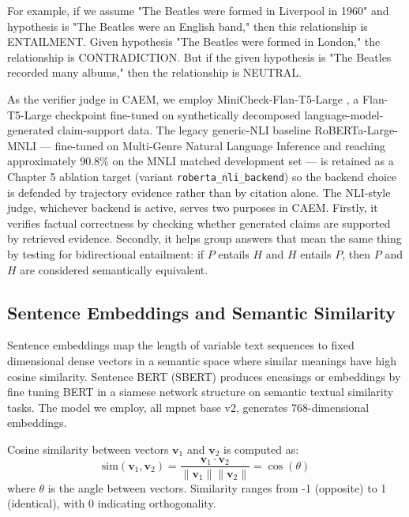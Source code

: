 For example, if we assume "The Beatles were formed in Liverpool in 1960" and hypothesis is "The Beatles were an English band," then this relationship is ENTAILMENT. Given hypothesis "The Beatles were formed in London," the relationship is CONTRADICTION. But if the given hypothesis is "The Beatles recorded many albums," then the relationship is NEUTRAL.

As the verifier judge in CAEM, we employ MiniCheck-Flan-T5-Large \citep{tang2024minicheck}, a Flan-T5-Large checkpoint fine-tuned on synthetically decomposed language-model-generated claim-support data. The legacy generic-NLI baseline RoBERTa-Large-MNLI \cite{liu2019roberta} --- fine-tuned on Multi-Genre Natural Language Inference and reaching approximately 90.8\% on the MNLI matched development set --- is retained as a Chapter 5 ablation target (variant \texttt{roberta\_nli\_backend}) so the backend choice is defended by trajectory evidence rather than by citation alone. The NLI-style judge, whichever backend is active, serves two purposes in CAEM. Firstly, it verifies factual correctness by checking whether generated claims are supported by retrieved evidence. Secondly, it helps group answers that mean the same thing by testing for bidirectional entailment: if $P$ entails $H$ and $H$ entails $P$, then $P$ and $H$ are considered semantically equivalent.

\subsection{Sentence Embeddings and Semantic Similarity}

Sentence embeddings map the length of variable text sequences to fixed dimensional dense vectors in a semantic space where similar meanings have high cosine similarity. Sentence BERT (SBERT) \cite{reimers-gurevych-2019-sentence} produces encasings or embeddings by fine tuning BERT in a siamese network structure on semantic textual similarity tasks. The model we employ, all mpnet base v2, generates 768-dimensional embeddings.

Cosine similarity between vectors $\mathbf{v}_1$ and $\mathbf{v}_2$ is computed as:
\begin{equation}
\text{sim}(\mathbf{v}_1, \mathbf{v}_2) = \frac{\mathbf{v}_1 \cdot \mathbf{v}_2}{\|\mathbf{v}_1\| \|\mathbf{v}_2\|} = \cos(\theta)
\end{equation}
where $\theta$ is the angle between vectors. Similarity ranges from -1 (opposite) to 1 (identical), with 0 indicating orthogonality.

